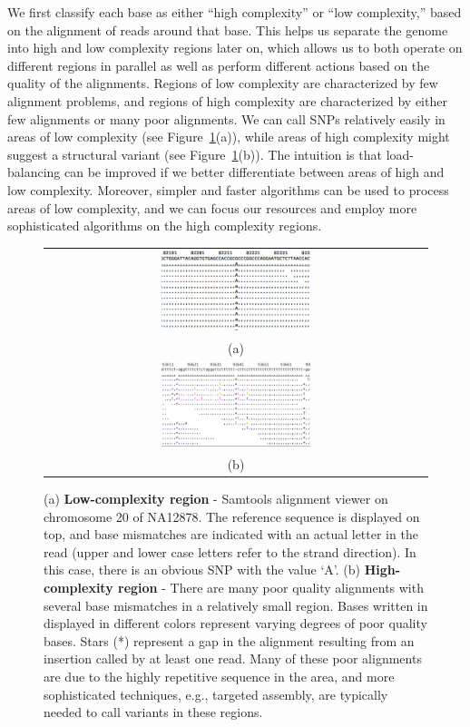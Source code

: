 \documentclass[10pt]{article}
\begin{document}
We first classify each base as either ``high complexity'' or ``low complexity,'' based on the alignment of reads around that base.
This helps us separate the genome into high and low complexity regions later on, which allows us to both operate on different regions in parallel as well as perform different actions based on the quality of the alignments.
Regions of low complexity are characterized by few alignment problems, and regions of high complexity are characterized by either few alignments or many poor alignments.
We can call SNPs relatively easily in
areas of low complexity (see Figure~\ref{low-complexity}(a)), while areas of
high complexity might suggest a structural variant (see
Figure~\ref{low-complexity}(b)).
The intuition is that load-balancing can be improved if we better differentiate between areas of high and low complexity.
Moreover, simpler and faster algorithms can be used to process areas of low complexity, and we can focus our resources and employ more sophisticated algorithms on the high complexity regions.

\begin{figure}[h!]
\begin{center}
\begin{tabular} {@{}c@{}}
  \includegraphics[width=0.40\textwidth]{figs/snp.png} \\ %
   (a) \\
  \includegraphics[width=0.40\textwidth]{figs/high-weirdness.png} \\
   (b) \\
\end{tabular}
\end{center}
\caption{(a) \textbf{Low-complexity region} - Samtools alignment viewer on
chromosome 20 of NA12878.  The reference sequence is displayed on top, and base
mismatches are indicated with an actual letter in the read (upper and lower
case letters refer to the strand direction).  In this case, there is an obvious
SNP with the value `A'. (b) \textbf{High-complexity region} - There are many
poor quality alignments with several base mismatches in a relatively small
region. Bases written in displayed in different colors represent varying degrees of poor quality bases. Stars (*) represent a gap in the alignment resulting from an insertion called by at least one read. Many of these poor alignments are due to the highly repetitive
sequence in the area, and more sophisticated techniques, e.g., targeted assembly,
are typically needed to call variants in these regions.  }
  \label{low-complexity}
\end{figure}
\end{document}
